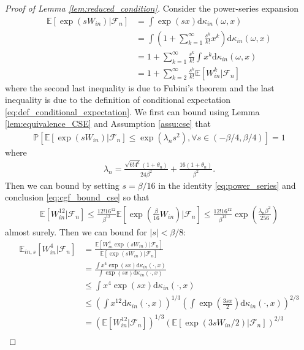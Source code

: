\documentclass[12pt]{article}
\theoremstyle{definition}
\def\P{\mathbb{P}}
\def\P{\mathbb{P}}
\newcommand{\E}{\mathbb E}								%
\renewcommand{\P}{\mathbb{P}}							%
\begin{document}
\begin{proof}[Proof of Lemma \ref{lem:reduced_condition}]
	Consider the power-series expansion 
	\begin{align}
		\E[\exp(sW_{in})|\mathcal{F}_n]
		&\nonumber
		=\int \exp(sx)\mathrm{d}\kappa_{in}(\omega,x)\\
		&\nonumber
		=\int\left(1+\sum_{k=1}^{\infty}\frac{s^k}{k!}x^k\right)\mathrm{d}\kappa_{in}(\omega,x) \\
		&\nonumber
		=1+\sum_{k=1}^{\infty}\frac{s^k}{k!}\int x^k\mathrm{d}\kappa_{in}(\omega,x)\\ 
		&\label{eq:power_series}
		=1+\sum_{k=2}^{\infty}\frac{s^k}{k!}\E[W_{in}^k|\mathcal{F}_n]
	\end{align}
	where the second last inequality is due to Fubini's theorem and the last inequality is due to the definition of conditional expectation \eqref{eq:def_conditional_expectation}. We first can bound using Lemma \ref{lem:equivalence_CSE} and Assumption \ref{assu:cse} that
	\begin{align}\label{eq:cgf_bound_cse}
		\P\left[\E[\exp(sW_{in})|\mathcal{F}_n]\leq \exp(\lambda_n s^2),\forall s\in (-\beta/4,\beta/4)\right]=1
	\end{align}
	where 
	\begin{align*}
		\lambda_n=\frac{\sqrt{6!4^6}(1+\theta_{n})}{24\beta^2}+\frac{16(1+\theta_{n})}{\beta^2}.
	\end{align*}
	Then we can bound by setting $s=\beta/16$ in the identity \eqref{eq:power_series} and conclusion \eqref{eq:cgf_bound_cse} so that 
	\begin{align}\label{eq:eighth_moment_bound}
		\E[W_{in}^{12}|\mathcal{F}_n]\leq \frac{12!16^{12}}{\beta^{12}}\E\left[\exp\left(\frac{\beta}{16}W_{in}\right)|\mathcal{F}_n\right]\leq \frac{12!16^{12}}{\beta^{12}}\exp\left(\frac{\lambda_n \beta^2}{256}\right)
	\end{align}
	almost surely. Then we can bound for $|s|<\beta/8$:
	\begin{align*}
		\E_{in,s}[W_{in}^4|\mathcal{F}_n]
		&
		=\frac{\E[W_{in}^4\exp(sW_{in})|\mathcal{F}_n]}{\E[\exp(sW_{in})|\mathcal{F}_n]}\\
		&
		=\frac{\int x^4 \exp(sx)\mathrm{d}\kappa_{in}(\cdot,x)}{\int \exp(sx)\mathrm{d}\kappa_{in}(\cdot,x)}\\
		&
		\leq \int x^4 \exp(sx)\mathrm{d}\kappa_{in}(\cdot,x)\\
		&
		\leq \left(\int x^{12} \mathrm{d}\kappa_{in}(\cdot,x)\right)^{1/3}\left(\int \exp\left(\frac{3sx}{2}\right)\mathrm{d}\kappa_{in}(\cdot,x)\right)^{2/3}\\
		&
		= \left(\E[W_{in}^{12}|\mathcal{F}_n]\right)^{1/3}\left(\E[\exp(3sW_{in}/2)|\mathcal{F}_n]\right)^{2/3}\\

\end{align*}
\end{proof}
\end{document}
